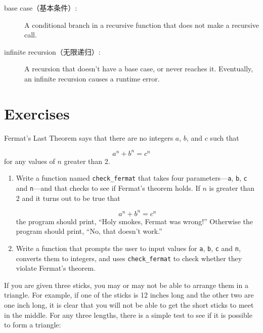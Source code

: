 \documentclass[10pt]{book}
\begin{document}
\begin{CJK}{UTF8}{gbsn}
\begin{description}
\item[base case（基本条件）:]  A conditional branch in a
recursive function that does not make a recursive call.

\item[infinite recursion（无限递归）:]  A recursion that doesn't have a
base case, or never reaches it.  Eventually, an infinite recursion
causes a runtime error.

\end{description}

\section{Exercises}

\begin{exercise}

Fermat's Last Theorem says that there are no integers
$a$, $b$, and $c$ such that

\[ a^n + b^n = c^n \]
%
for any values of $n$ greater than 2.

\begin{enumerate}

\item Write a function named \verb"check_fermat" that takes four
parameters---{\tt a}, {\tt b}, {\tt c} and {\tt n}---and
that checks to see if Fermat's theorem holds.  If
$n$ is greater than 2 and it turns out to be true that 

\[a^n + b^n = c^n \]
%
the program should print, ``Holy smokes, Fermat was wrong!''
Otherwise the program should print, ``No, that doesn't work.''

\item Write a function that prompts the user to input values
for {\tt a}, {\tt b}, {\tt c} and {\tt n}, converts them to
integers, and uses \verb"check_fermat" to check whether they
violate Fermat's theorem.

\end{enumerate}

\end{exercise}


\begin{exercise}

If you are given three sticks, you may or may not be able to arrange
them in a triangle.  For example, if one of the sticks is 12 inches
long and the other two are one inch long, it is clear that you will
not be able to get the short sticks to meet in the middle.  For any
three lengths, there is a simple test to see if it is possible to form
a triangle:


\end{exercise}
\end{CJK}
\end{document}
